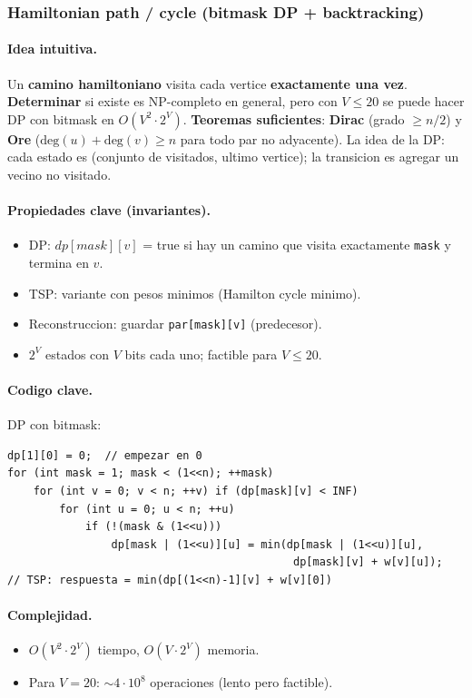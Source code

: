 ﻿\subsubsection{Hamiltonian path / cycle (bitmask DP + backtracking)}

\paragraph{Idea intuitiva.}
Un \textbf{camino hamiltoniano} visita cada vertice \textbf{exactamente una vez}. \textbf{Determinar} si existe es NP-completo en general, pero con $V \le 20$ se puede hacer DP con bitmask en $O(V^2 \cdot 2^V)$. \textbf{Teoremas suficientes}: \textbf{Dirac} (grado $\ge n/2$) y \textbf{Ore} ($\text{deg}(u) + \text{deg}(v) \ge n$ para todo par no adyacente). La idea de la DP: cada estado es (conjunto de visitados, ultimo vertice); la transicion es agregar un vecino no visitado.

\paragraph{Propiedades clave (invariantes).}
\begin{itemize}\setlength\itemsep{0pt}
	\item DP: $dp[mask][v]$ = true si hay un camino que visita exactamente \texttt{mask} y termina en $v$.
	\item TSP: variante con pesos minimos (Hamilton cycle minimo).
	\item Reconstruccion: guardar \texttt{par[mask][v]} (predecesor).
	\item $2^V$ estados con $V$ bits cada uno; factible para $V \le 20$.
\end{itemize}

\paragraph{Codigo clave.}
DP con bitmask:
\begin{verbatim}
dp[1][0] = 0;  // empezar en 0
for (int mask = 1; mask < (1<<n); ++mask)
    for (int v = 0; v < n; ++v) if (dp[mask][v] < INF)
        for (int u = 0; u < n; ++u)
            if (!(mask & (1<<u)))
                dp[mask | (1<<u)][u] = min(dp[mask | (1<<u)][u],
                                            dp[mask][v] + w[v][u]);
// TSP: respuesta = min(dp[(1<<n)-1][v] + w[v][0])
\end{verbatim}

\paragraph{Complejidad.}
\begin{itemize}\setlength\itemsep{0pt}
	\item $O(V^2 \cdot 2^V)$ tiempo, $O(V \cdot 2^V)$ memoria.
	\item Para $V = 20$: $\sim 4 \cdot 10^8$ operaciones (lento pero factible).
\end{itemize}

